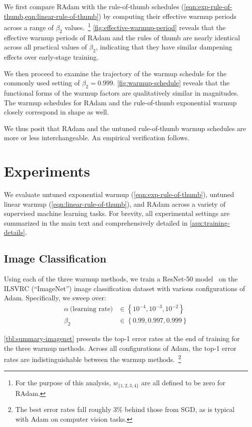 {We first compare RAdam with the rule-of-thumb schedules (\cref*{eqn:exp-rule-of-thumb,eqn:linear-rule-of-thumb}) by computing their effective warmup periods across a range of $\beta_2$ values.~\footnote{For the purpose of this analysis, $w_{\{1, 2, 3, 4\}}$ are all defined to be zero for RAdam.} \cref*{fig:effective-warmup-period} reveals that the effective warmup periods of RAdam and the rules of thumb are nearly identical across all practical values of $\beta_2$, indicating that they have similar dampening effects over early-stage training.

We then proceed to examine the trajectory of the warmup schedule for the commonly used setting of $\beta_2 = 0.999$. \cref*{fig:warmup-schedule} reveals that the functional forms of the warmup factors are qualitatively similar in magnitudes. The warmup schedules for RAdam and the rule-of-thumb exponential warmup closely correspond in shape as well.

We thus posit that RAdam and the untuned rule-of-thumb warmup schedules are more or less interchangeable. An empirical verification follows.\section{Experiments}
\label{sec:results}

We evaluate untuned exponential warmup (\cref*{eqn:exp-rule-of-thumb}), untuned linear warmup (\cref*{eqn:linear-rule-of-thumb}), and RAdam across a variety of supervised machine learning tasks. For brevity, all experimental settings are summarized in the main text and comprehensively detailed in \cref*{apx:training-details}.

\subsection{Image Classification}
\label{sec:results-imagenet}

Using each of the three warmup methods, we train a ResNet-50 model~\citep{he2016resnet} on the ILSVRC (``ImageNet'') image classification dataset with various configurations of Adam. Specifically, we sweep over:
\begin{align*}
    \alpha~\text{(learning rate)} &\in \left\{ {10}^{-4}, {10}^{-3}, {10}^{-2} \right\} \\
    \beta_2 &\in \left\{ 0.99, 0.997, 0.999 \right\}
\end{align*}

\cref*{tbl:summary-imagenet} presents the top-1 error rates at the end of training for the three warmup methods. Across all configurations of Adam, the top-1 error rates are indistinguishable between the warmup methods.~\footnote{The best error rates fall roughly 3\% behind those from SGD, as is typical with Adam on computer vision tasks.}

}
